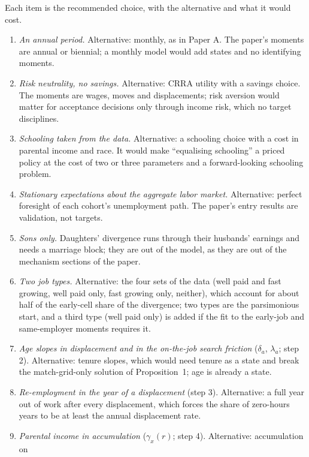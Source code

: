 \documentclass[11pt]{article}
\newcommand{\1}{\mathbf{1}}
\begin{document}
Each item is the recommended choice, with the alternative and what it would cost.
\begin{enumerate}[label=D\arabic*.]
  \item\label{dec:period} \textit{An annual period.} Alternative: monthly, as in Paper A. The paper's moments are annual
  or biennial; a monthly model would add states and no identifying moments.
  \item\label{dec:prefs} \textit{Risk neutrality, no savings.} Alternative: CRRA utility with a savings choice. The
  moments are wages, moves and displacements; risk aversion would matter for acceptance decisions only through income
  risk, which no target disciplines.
  \item\label{dec:school} \textit{Schooling taken from the data.} Alternative: a schooling choice with a cost in parental
  income and race. It would make ``equalising schooling'' a priced policy at the cost of two or three parameters and a
  forward-looking schooling problem.
  \item\label{dec:agg} \textit{Stationary expectations about the aggregate labor market.} Alternative: perfect foresight of
  each cohort's unemployment path. The paper's entry results are validation, not targets.
  \item \textit{Sons only.} Daughters' divergence runs through their husbands' earnings and needs a marriage block;
  they are out of the model, as they are out of the mechanism sections of the paper.
  \item\label{dec:types} \textit{Two job types.} Alternative: the four sets of the data (well paid and fast growing, well
  paid only, fast growing only, neither), which account for about half of the early-cell share of the divergence; two
  types are the parsimonious start, and a third type (well paid only) is added if the fit to the early-job and
  same-employer moments requires it.
  \item\label{dec:age} \textit{Age slopes in displacement and in the on-the-job search friction} ($\delta_a$,
  $\lambda_a$; step 2). Alternative: tenure slopes, which would need tenure as a state and break the match-grid-only
  solution of Proposition~1; age is already a state.
  \item\label{dec:rehire} \textit{Re-employment in the year of a displacement} (step 3). Alternative: a full year out of
  work after every displacement, which forces the share of zero-hours years to be at least the annual displacement rate.
  \item\label{dec:xacc} \textit{Parental income in accumulation} ($\gamma_x(r)$; step 4). Alternative: accumulation on

\end{enumerate}
\end{document}
